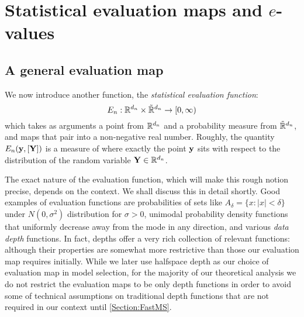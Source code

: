 

\section{Statistical evaluation maps and $e$-values}
\label{Section:EvaluationMap}


\subsection{A general evaluation map}
We now introduce another function, the {\textit{statistical evaluation function}}:
%
$$
E_{n} : {\mathbb{R}}^{ d_{n}} \times \tilde {{\mathbb{R}}}^{ d_{n}} \rightarrow [0, \infty)
$$
%
which takes as arguments a point from ${\mathbb{R}}^{ d_{n}}$ and a probability measure from $\tilde {{\mathbb{R}}}^{ d_{n}}$, and maps that pair into a non-negative real number. Roughly, the quantity $E_{n} ({\bf{y}}, [{\mathbf{Y}}])$ is a measure of where exactly the point ${\bf{y}}$ sits with respect to the distribution of the random variable ${\mathbf{Y}} \in {\mathbb{R}}^{ d_{n}}$.

The exact nature of the evaluation function, which will make this rough notion precise, depends on the context. We shall discuss this in detail shortly. Good examples of evaluation functions are probabilities of sets like $A_{\delta} = \{ x : |x| < \delta \}$ under $N( 0, \sigma^2)$ distribution for $\sigma>0$, unimodal probability density functions that uniformly decrease away from the mode in any direction, and various \textit{data depth} functions. In fact, depths offer a very rich collection of relevant functions: although their properties are somewhat more restrictive than those our evaluation map requires initially. While we later use halfspace depth \citep{tukey75} as our choice of evaluation map in model selection, for the majority of our theoretical analysis we do not restrict the evaluation maps to be only depth functions in order to avoid some of technical assumptions on traditional depth functions that are not required in our context until \ref{Section:FastMS}.



